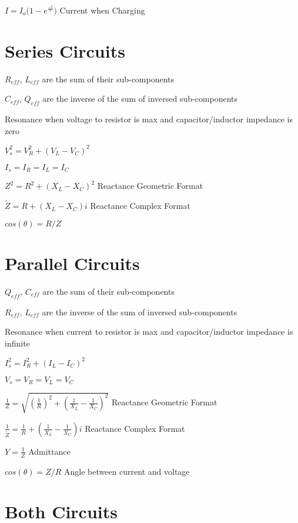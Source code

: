 \documentclass{article}
\begin{document}
\LARGE$I = I_o({1-e^{\frac{-t}{\tau} })}$
\large{Current when Charging}



\section{Series Circuits}

\large {$R_{eff}$, $L_{eff}$ are the sum of their sub-components}

\large {$C_{eff}$, $Q_{eff}$ are the inverse of the sum of inversed sub-components }

\large {Resonance when voltage to resistor is max and capacitor/inductor impedance is zero}

\LARGE$V_s^2 =V_R^2+(V_L-V_C)^2$

\LARGE$I_s =I_R=I_L=I_C$

\LARGE$Z^2 =R^2+(X_L-X_C)^2$
\large Reactance Geometric Format

\LARGE$\widetilde{Z} =R+(X_L-X_C)i$
\large Reactance Complex Format


\LARGE$cos(\theta)=R/Z$

\section{Parallel Circuits}

\large {$Q_{eff}$, $C_{eff}$ are the sum of their sub-components}

\large {$R_{eff}$, $L_{eff}$ are the inverse of the sum of inversed sub-components }

\large {Resonance when current to resistor is max and capacitor/inductor impedance is infinite}


\LARGE$I_s^2 =I_R^2+(I_L-I_C)^2$

\LARGE$V_s =V_R=V_L=V_C$

\LARGE$\frac{1}{Z} =\sqrt{(\frac{1}{R})^2+(\frac{1}{X_L}-\frac{1}{X_C})^2}$ \large Reactance Geometric Format

\LARGE$\frac{1}{\widetilde{Z}} =\frac{1}{R}+
(\frac{1}{X_L}-\frac{1}{X_C})i$
\large Reactance Complex Format

\LARGE$Y=\frac{1}{Z}$
\large {Admittance}

\LARGE$cos(\theta)=Z/R$
\large {Angle between current and voltage}

\section{ Both Circuits}
\end{document}
